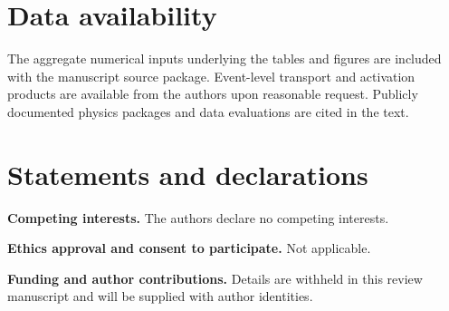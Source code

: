 \documentclass[11pt]{article}
\begin{document}
\section*{Data availability}

The aggregate numerical inputs underlying the tables and figures are included
with the manuscript source package. Event-level transport and activation
products are available from the authors upon reasonable request. Publicly
documented physics packages and data evaluations are cited in the text.

\section*{Statements and declarations}

\noindent\textbf{Competing interests.} The authors declare no competing
interests.

\noindent\textbf{Ethics approval and consent to participate.} Not applicable.

\noindent\textbf{Funding and author contributions.} Details are withheld in
this review manuscript and will be supplied with author identities.



\end{document}
